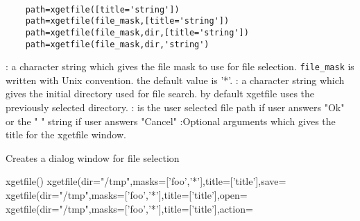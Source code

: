 
\begin{mandesc}
  \\ %
\end{mandesc}
\label{xgetfile}
\begin{calling_sequence}
  \begin{verbatim}
    path=xgetfile([title='string'])  
    path=xgetfile(file_mask,[title='string'])  
    path=xgetfile(file_mask,dir,[title='string'])  
    path=xgetfile(file_mask,dir,'string')  
  \end{verbatim}
\end{calling_sequence}
\begin{parameters}
  \begin{varlist}
     : a character string which gives the file mask to use for file selection. \verb!file_mask! is written with Unix convention. the default value is '*'.
     : a character string which gives the initial directory used for file search. by default xgetfile uses the previously selected directory.
     : is the user selected file path if user answers "Ok" or the " " string if user answers "Cancel"
     :Optional arguments which gives the title for the xgetfile window.
  \end{varlist}
\end{parameters}
\begin{mandescription}
  Creates a dialog window for file selection
\end{mandescription}
\begin{examples}
  \begin{program}
    xgetfile()
    xgetfile(dir="/tmp",masks=['foo','*'],title=['title'],save=%
    xgetfile(dir="/tmp",masks=['foo','*'],title=['title'],open=%
    xgetfile(dir="/tmp",masks=['foo','*'],title=['title'],action=%
  \end{program}
\end{examples}
\begin{manseealso}
         
\end{manseealso}

